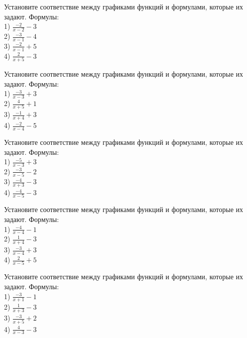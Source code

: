 \documentclass[4apaper]{article}
\begin{document}
\begin{taskBN}{91}
Установите соответствие между графиками функций и формулами, которые их задают. Формулы: \\1) $\frac{-2}{x-2}-3$\\2) $\frac{-3}{x-1}-4$\\3) $\frac{-2}{x-1}+5$\\4) $\frac{2}{x+5}-3$
\end{taskBN}

\begin{taskBN}{92}
Установите соответствие между графиками функций и формулами, которые их задают. Формулы: \\1) $\frac{-3}{x-3}+3$\\2) $\frac{4}{x+5}+1$\\3) $\frac{-1}{x+4}+3$\\4) $\frac{-2}{x-4}-5$
\end{taskBN}

\begin{taskBN}{93}
Установите соответствие между графиками функций и формулами, которые их задают. Формулы: \\1) $\frac{-5}{x-3}+3$\\2) $\frac{-3}{x-5}-2$\\3) $\frac{-4}{x+3}-3$\\4) $\frac{-4}{x-5}-3$
\end{taskBN}

\begin{taskBN}{94}
Установите соответствие между графиками функций и формулами, которые их задают. Формулы: \\1) $\frac{-4}{x-4}-1$\\2) $\frac{1}{x+4}-3$\\3) $\frac{-3}{x-4}+3$\\4) $\frac{2}{x-5}+5$
\end{taskBN}

\begin{taskBN}{95}
Установите соответствие между графиками функций и формулами, которые их задают. Формулы: \\1) $\frac{-3}{x+1}-1$\\2) $\frac{1}{x+3}-3$\\3) $\frac{-3}{x+5}+2$\\4) $\frac{4}{x-3}-3$
\end{taskBN}
\end{document}

